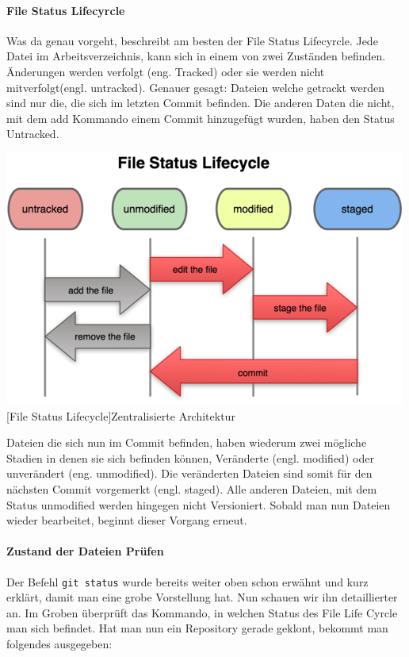 \documentclass[12pt,a4paper,bibliography=totocnumbered,listof=totocnumbered]{scrartcl}
\begin{document}
\paragraph{File Status Lifecyrcle}
Was da genau vorgeht, beschreibt am besten der File Status Lifecyrcle. Jede Datei im Arbeitsverzeichnis, kann sich in einem von zwei Zuständen befinden. Änderungen werden verfolgt (eng. Tracked) oder sie werden nicht mitverfolgt(engl. untracked). 
Genauer gesagt: Dateien welche getrackt werden sind nur die, die sich im letzten Commit befinden. Die anderen Daten die nicht, mit dem add Kommando einem Commit hinzugefügt wurden, haben den Status Untracked. \newline


\newline
\newline
\vspace{1em}
\begin{minipage}{\linewidth}
	\centering
	\includegraphics[width=0.6\linewidth]{Bilder/flc.png}
	[File Status Lifecycle]{Zentralisierte Architektur\footnotemark }
	\label{fig:osgi}
\end{minipage} 	

Dateien die sich nun im Commit befinden, haben wiederum zwei mögliche Stadien in denen sie sich befinden können, Veränderte (engl. modified) oder unverändert (eng. unmodified). Die veränderten Dateien sind somit für den nächsten Commit vorgemerkt (engl. staged). Alle anderen Dateien, mit dem Status unmodified werden hingegen nicht Versioniert. Sobald man nun Dateien wieder bearbeitet, beginnt dieser Vorgang erneut.

\paragraph{Zustand der Dateien Prüfen}
Der Befehl \lstinline|git status| wurde bereits weiter oben schon erwähnt und kurz erklärt, damit man eine grobe Vorstellung hat. Nun schauen wir ihn detaillierter an. Im Groben überprüft das Kommando, in welchen Status des File Life Cyrcle man sich befindet. Hat man nun ein Repository gerade geklont, bekommt man folgendes ausgegeben:
\end{document}
